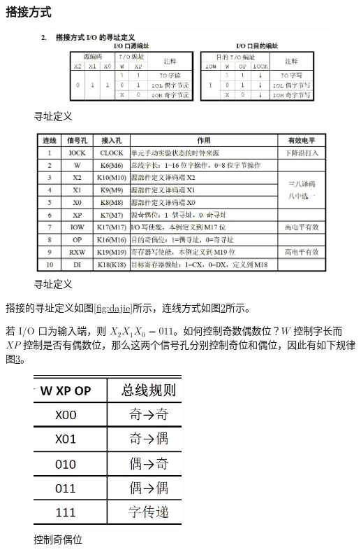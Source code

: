\documentclass[a4paper,10pt,UTF8]{paper}
\numberwithin{equation}{section}
\numberwithin{figure}{section}
\begin{document}
\subsubsection{搭接方式}

\begin{figure}[h]
    \centering
    \includegraphics[width=1\textwidth]{dajie.JPG}
    \caption{寻址定义}
    \label{fig:xunzhi}
\end{figure}

\begin{figure}[h]
    \centering
    \includegraphics[width=1\textwidth]{lianxian.JPG}
    \caption{寻址定义}
    \label{fig:lianxian}
\end{figure}




搭接的寻址定义如图\ref{fig:dajie}所示，连线方式如图\ref{fig:lianxian}所示。

若 I/O 口为输入端，则 $X_2X_1X_0 = 011$。如何控制奇数偶数位？$W$ 控制字长而 $XP$ 控制是否有偶数位，那么这两个信号孔分别控制奇位和偶位，因此有如下规律 图\ref{fig:jiou}。


\begin{figure}[h]
    \centering
    \includegraphics[width=0.5\textwidth]{jiou.JPG}
    \caption{控制奇偶位}
    \label{fig:jiou}
\end{figure}
\end{document}
